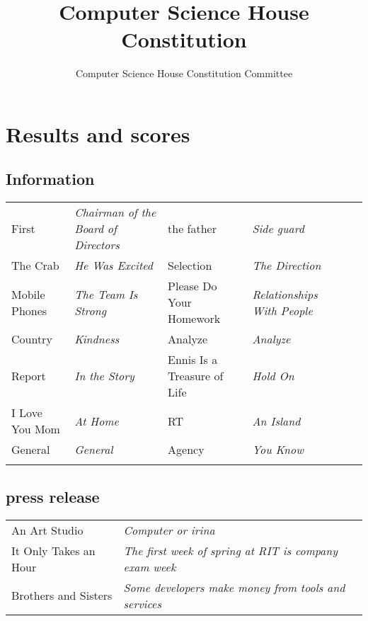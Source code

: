 \documentclass{article}
\title{Computer Science House Constitution}
\author{Computer Science House Constitution Committee}
\date{\datechanged}
\newcommand{\article}[1]{\section{#1} \label{#1}}
\begin{document}
\maketitle

\tableofcontents

\article{Results and scores}

\subsection{Information}
\begin{tabular}{ l  l  l l l l}
	First   & \textit{Chairman of the Board of Directors}            & the father & \textit{Side guard} \\
	The Crab     & \textit{He Was Excited} & Selection        & \textit{The Direction}   \\
	Mobile Phones & \textit{The Team Is Strong}        & Please Do Your Homework            & \textit{Relationships With People}             \\
	Country & \textit{Kindness}          & Analyze          & \textit{Analyze}     \\
	Report & \textit{In the Story}          & Ennis Is a Treasure of Life       & \textit{Hold On}               \\
	I Love You Mom    & \textit{At Home}     & RT        & \textit{An Island}          \\
	General   & \textit{General}           & Agency        & \textit{You Know}                      \\                                  \\
\end{tabular}

\subsection{press release}

\begin{tabular}{l l}
	An Art Studio        & \textit{Computer or irina}                                     \\
	It Only Takes an Hour & \textit{The first week of spring at RIT is company exam week} \\
	Brothers and Sisters         & \textit{Some developers make money from tools and services}
\end{tabular}
\end{document}
